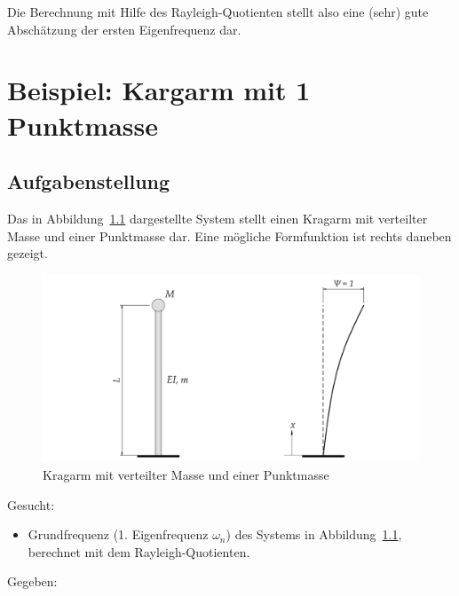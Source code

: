 \documentclass[
  letterpaper,
  DIV=11]{scrreprt}
\providecommand{\tightlist}{%
  \setlength{\itemsep}{0pt}\setlength{\parskip}{0pt}}\usepackage{longtable,booktabs,array}
\begin{document}
Die Berechnung mit Hilfe des Rayleigh-Quotienten stellt also eine (sehr)
gute Abschätzung der ersten Eigenfrequenz dar.

\hypertarget{beispiel-kargarm-mit-1-punktmasse}{%
\chapter{Beispiel: Kargarm mit 1
Punktmasse}\label{beispiel-kargarm-mit-1-punktmasse}}

\hypertarget{aufgabenstellung-1}{%
\section{Aufgabenstellung}\label{aufgabenstellung-1}}

Das in Abbildung~\ref{fig-kragarm_1_punkte} dargestellte System stellt
einen Kragarm mit verteilter Masse und einer Punktmasse dar. Eine
mögliche Formfunktion ist rechts daneben gezeigt.

\begin{figure}[H]

{\centering \includegraphics{index_files/mediabag/bilder/aufgabe_rayleigh_1_masse.pdf}

}

\caption{\label{fig-kragarm_1_punkte}Kragarm mit verteilter Masse und
einer Punktmasse}

\end{figure}

Gesucht:

\begin{itemize}
\tightlist
\item
  Grundfrequenz (1. Eigenfrequenz \(\omega_n\)) des Systems in
  Abbildung~\ref{fig-kragarm_1_punkte}, berechnet mit dem
  Rayleigh-Quotienten.
\end{itemize}

Gegeben:
\end{document}
